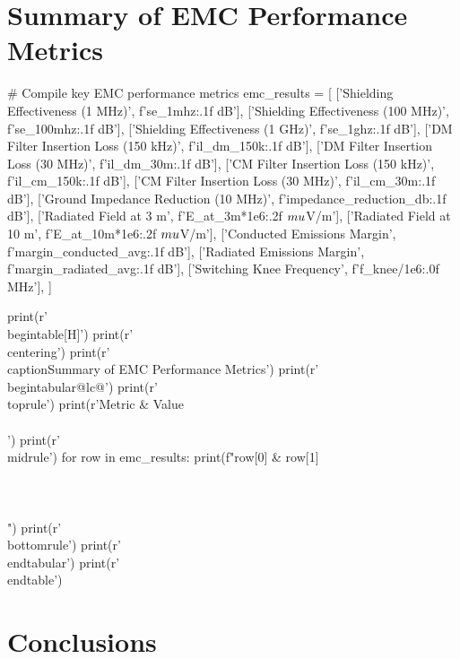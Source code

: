 \documentclass[11pt,a4paper]{article}
\begin{document}
\section{Summary of EMC Performance Metrics}

\begin{pycode}
# Compile key EMC performance metrics
emc_results = [
    ['Shielding Effectiveness (1 MHz)', f'{se_1mhz:.1f} dB'],
    ['Shielding Effectiveness (100 MHz)', f'{se_100mhz:.1f} dB'],
    ['Shielding Effectiveness (1 GHz)', f'{se_1ghz:.1f} dB'],
    ['DM Filter Insertion Loss (150 kHz)', f'{il_dm_150k:.1f} dB'],
    ['DM Filter Insertion Loss (30 MHz)', f'{il_dm_30m:.1f} dB'],
    ['CM Filter Insertion Loss (150 kHz)', f'{il_cm_150k:.1f} dB'],
    ['CM Filter Insertion Loss (30 MHz)', f'{il_cm_30m:.1f} dB'],
    ['Ground Impedance Reduction (10 MHz)', f'{impedance_reduction_db:.1f} dB'],
    ['Radiated Field at 3 m', f'{E_at_3m*1e6:.2f} $\\mu$V/m'],
    ['Radiated Field at 10 m', f'{E_at_10m*1e6:.2f} $\\mu$V/m'],
    ['Conducted Emissions Margin', f'{margin_conducted_avg:.1f} dB'],
    ['Radiated Emissions Margin', f'{margin_radiated_avg:.1f} dB'],
    ['Switching Knee Frequency', f'{f_knee/1e6:.0f} MHz'],
]

print(r'\\begin{table}[H]')
print(r'\\centering')
print(r'\\caption{Summary of EMC Performance Metrics}')
print(r'\\begin{tabular}{@{}lc@{}}')
print(r'\\toprule')
print(r'Metric & Value \\\\')
print(r'\\midrule')
for row in emc_results:
    print(f"{row[0]} & {row[1]} \\\\\\\\")
print(r'\\bottomrule')
print(r'\\end{tabular}')
print(r'\\end{table}')
\end{pycode}

\section{Conclusions}
\end{document}
